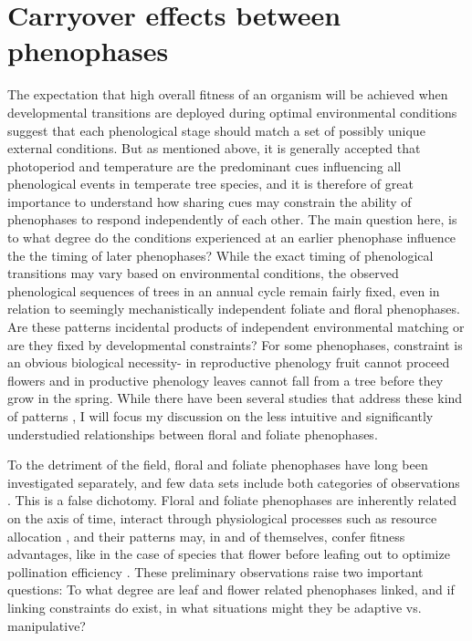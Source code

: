 \documentclass{article}\usepackage[]{graphicx}\usepackage[]{color}
\begin{document}
\section{Carryover effects between phenophases}
\par The expectation that high overall fitness of an organism will be achieved when developmental transitions are deployed during optimal environmental conditions suggest that each phenological stage should match a set of possibly unique external conditions. But as mentioned above, it is generally accepted that photoperiod and temperature are the predominant cues influencing all phenological events in temperate tree species, and it is therefore of great importance to understand how sharing cues may constrain the ability of phenophases to respond independently of each other. The main question here, is to what degree do the conditions experienced at an earlier phenophase influence the the timing of later phenophases? While the exact timing of phenological transitions may vary based on environmental conditions, the observed phenological sequences of trees in an annual cycle remain fairly fixed, even in relation to seemingly mechanistically independent foliate and floral phenophases. Are these patterns incidental products of independent environmental matching or are they fixed by developmental constraints? For some phenophases, constraint is an obvious biological necessity- in reproductive phenology fruit cannot proceed flowers and in productive phenology leaves cannot fall from a tree before they grow in the spring. While there have been several studies that address these kind of patterns \citep{Richardson something, Primack something}, I will focus my discussion on the less intuitive and significantly understudied relationships between floral and foliate phenophases.
\par To the detriment of the field, floral and foliate phenophases have long been investigated separately, and few data sets include both categories of observations \citep{Wolkovich and Ettinger}. This is a false dichotomy. Floral and foliate phenophases are inherently related on the axis of time, interact through physiological processes such as resource allocation \cite{}, and their patterns may, in and of themselves, confer fitness advantages, like in the case of species that flower before leafing out to optimize pollination efficiency \citep{}. These preliminary observations raise two important questions: To what degree are leaf and flower related phenophases linked, and if linking constraints do exist, in what situations might they be adaptive vs. manipulative?
\end{document}
